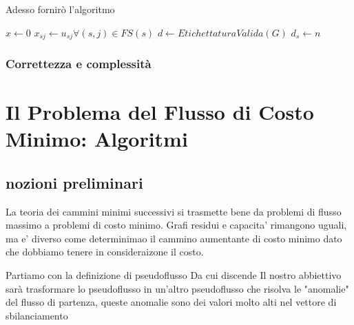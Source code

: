 Adesso fornirò l'algoritmo 
\begin{algorithm}
  $x\gets 0$\;
  $x_{sj} \gets u_{sj} \forall(s, j) \in FS (s)$
  $d\gets EtichettaturaValida(G)$\;
  $d_s \gets n$
\end{algorithm}
\subsubsection{Correttezza e complessità}

\section{Il Problema del Flusso di Costo Minimo: Algoritmi}
\subsection{nozioni preliminari}
La teoria dei cammini minimi successivi si trasmette bene da problemi di flusso massimo a problemi di costo minimo. Grafi residui e capacita' rimangono uguali, ma e' diverso come determinimao il cammino aumentante di costo minimo dato che dobbiamo tenere in consideraizone il costo.

Partiamo con la definizione di pseudoflusso
Da cui discende 
Il nostro abbiettivo sarà trasformare lo pseudoflusso in un'altro pseudoflusso che risolva le "anomalie" del flusso di partenza, queste anomalie sono dei valori molto alti nel vettore di sbilanciamento

